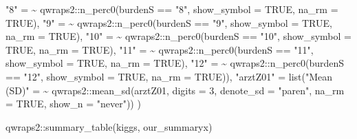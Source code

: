 \documentclass[
]{article}
\newenvironment{Shaded}{\begin{snugshade}}{\end{snugshade}}
\newcommand{\AttributeTok}[1]{\textcolor[rgb]{0.77,0.63,0.00}{#1}}
\newcommand{\ConstantTok}[1]{\textcolor[rgb]{0.00,0.00,0.00}{#1}}
\newcommand{\DecValTok}[1]{\textcolor[rgb]{0.00,0.00,0.81}{#1}}
\newcommand{\ErrorTok}[1]{\textcolor[rgb]{0.64,0.00,0.00}{\textbf{#1}}}
\newcommand{\FunctionTok}[1]{\textcolor[rgb]{0.00,0.00,0.00}{#1}}
\newcommand{\NormalTok}[1]{#1}
\newcommand{\OtherTok}[1]{\textcolor[rgb]{0.56,0.35,0.01}{#1}}
\newcommand{\SpecialCharTok}[1]{\textcolor[rgb]{0.00,0.00,0.00}{#1}}
\newcommand{\StringTok}[1]{\textcolor[rgb]{0.31,0.60,0.02}{#1}}
\begin{document}
\begin{Shaded}
\begin{Highlighting}[]
            \StringTok{"8"} \OtherTok{=} \ErrorTok{\textasciitilde{}}\NormalTok{ qwraps2}\SpecialCharTok{::}\FunctionTok{n\_perc0}\NormalTok{(burdenS }\SpecialCharTok{==} \StringTok{"8"}\NormalTok{, }\AttributeTok{show\_symbol =} \ConstantTok{TRUE}\NormalTok{, }\AttributeTok{na\_rm =} \ConstantTok{TRUE}\NormalTok{),}
            \StringTok{"9"} \OtherTok{=} \ErrorTok{\textasciitilde{}}\NormalTok{ qwraps2}\SpecialCharTok{::}\FunctionTok{n\_perc0}\NormalTok{(burdenS }\SpecialCharTok{==} \StringTok{"9"}\NormalTok{, }\AttributeTok{show\_symbol =} \ConstantTok{TRUE}\NormalTok{, }\AttributeTok{na\_rm =} \ConstantTok{TRUE}\NormalTok{),}
            \StringTok{"10"} \OtherTok{=} \ErrorTok{\textasciitilde{}}\NormalTok{ qwraps2}\SpecialCharTok{::}\FunctionTok{n\_perc0}\NormalTok{(burdenS }\SpecialCharTok{==} \StringTok{"10"}\NormalTok{, }\AttributeTok{show\_symbol =} \ConstantTok{TRUE}\NormalTok{, }\AttributeTok{na\_rm =} \ConstantTok{TRUE}\NormalTok{),}
            \StringTok{"11"} \OtherTok{=} \ErrorTok{\textasciitilde{}}\NormalTok{ qwraps2}\SpecialCharTok{::}\FunctionTok{n\_perc0}\NormalTok{(burdenS }\SpecialCharTok{==} \StringTok{"11"}\NormalTok{, }\AttributeTok{show\_symbol =} \ConstantTok{TRUE}\NormalTok{, }\AttributeTok{na\_rm =} \ConstantTok{TRUE}\NormalTok{),}
            \StringTok{"12"} \OtherTok{=} \ErrorTok{\textasciitilde{}}\NormalTok{ qwraps2}\SpecialCharTok{::}\FunctionTok{n\_perc0}\NormalTok{(burdenS }\SpecialCharTok{==} \StringTok{"12"}\NormalTok{, }\AttributeTok{show\_symbol =} \ConstantTok{TRUE}\NormalTok{, }\AttributeTok{na\_rm =} \ConstantTok{TRUE}\NormalTok{)),}
      \StringTok{"arztZ01"} \OtherTok{=}
       \FunctionTok{list}\NormalTok{(}\StringTok{"Mean (SD)"} \OtherTok{=} \ErrorTok{\textasciitilde{}}\NormalTok{ qwraps2}\SpecialCharTok{::}\FunctionTok{mean\_sd}\NormalTok{(arztZ01, }\AttributeTok{digits =} \DecValTok{3}\NormalTok{, }\AttributeTok{denote\_sd =} \StringTok{"paren"}\NormalTok{, }\AttributeTok{na\_rm =} \ConstantTok{TRUE}\NormalTok{, }\AttributeTok{show\_n =} \StringTok{"never"}\NormalTok{))}
\NormalTok{     )}

\NormalTok{qwraps2}\SpecialCharTok{::}\FunctionTok{summary\_table}\NormalTok{(kiggs, our\_summaryx)}
\end{Highlighting}
\end{Shaded}
\end{document}
